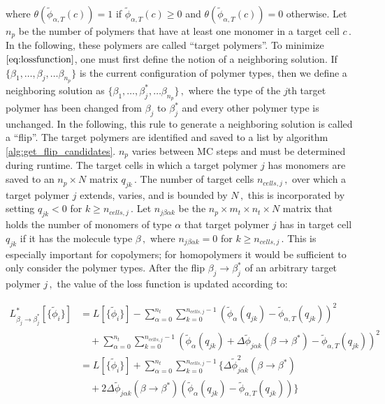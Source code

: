 \documentclass[bachelor,       %
               twoside,        %
               BCOR10mm,       %
               ngerman, english %
               ]{GAUBM}
\begin{document}
where $\theta(\tilde{\phi}_{\alpha,T}(c))=1$ if $\tilde{\phi}_{\alpha,T}(c)\ge 0$ and $\theta(\tilde{\phi}_{\alpha,T}(c))=0$ otherwise. Let $n_p$ be the number of polymers that have at least one monomer in a target cell $c\,.$ In the following, these polymers are called \enquote{target polymers}. To minimize $\eqref{eq:lossfunction}$, one must first define the notion of a neighboring solution. If $\{\beta_1,\dots,\beta_j,\dots\beta_{n_p}\}$ is the current configuration of polymer types, then we define a neighboring solution as $\{\beta_1,\dots,\beta^*_j,\dots\beta_{n_p}\}\,,$ where the type of the $j$th target polymer has been changed from $\beta_j$ to $\beta_j^*$ and every other polymer type is unchanged. In the following, this rule to generate a neighboring solution is called a \enquote{flip}. The target polymers are identified and saved to a list by algorithm \ref{alg:get_flip_candidates}. $n_p$ varies between \ac{MC} steps and must be determined during runtime. The target cells in which a target polymer $j$ has monomers are saved to an $n_p\times N$ matrix $q_{jk}\,.$ The number of target cells $n_{cells,j}\,,$ over which a target polymer $j$ extends, varies, and is bounded by $N\,,$ this is incorporated by setting $q_{jk}<0$ for $k\ge n_{cells,j}\,.$ Let $n_{j\beta\alpha k}$ be the $n_p\times m_t\times n_t\times N$ matrix that holds the number of monomers of type $\alpha$ that target polymer $j$ has in target cell $q_{jk}$ if it has the molecule type $\beta\,,$ where $n_{j\beta\alpha k}=0$ for $k\ge n_{cells,j}\,.$ This is especially important for copolymers; for homopolymers it would be sufficient to only consider the polymer types. After the flip $\beta_j\rightarrow \beta_j^*$ of an arbitrary target polymer $j\,,$ the value of the loss function is updated according to:

\begin{align}
    L^*_{\beta_j\rightarrow\beta_j^*}[\{\tilde\phi_i\}] &= L[\{\tilde\phi_i\}] 
    - \sum_{\alpha=0}^{n_t}\sum_{k=0}^{n_{cells,j}-1}  \left(\tilde{\phi}_\alpha(q_{jk})-\tilde{\phi}_{\alpha,T}(q_{jk})\right)^2\nonumber \\
    & \quad + \sum_{\alpha=0}^{n_t}\sum_{k=0}^{n_{cells,j}-1}  \left(\tilde{\phi}_\alpha(q_{jk})+\Delta\tilde\phi_{ j\alpha k}(\beta\rightarrow\beta^*)-\tilde{\phi}_{\alpha,T}(q_{jk})\right)^2\nonumber \\
    &= L[\{\tilde\phi_i\}] 
    + \sum_{\alpha=0}^{n_t}\sum_{k=0}^{n_{cells,j}-1}  \biggl\{\Delta\tilde\phi^2_{ j\alpha k}(\beta\rightarrow\beta^*) \nonumber\\
    &\quad + 2\Delta\tilde\phi_{ j\alpha k}(\beta\rightarrow\beta^*)\left(\tilde\phi_{\alpha}(q_{jk})-\tilde\phi_{\alpha,T}(q_{jk})\right)\biggr\}
\end{align}
\end{document}
